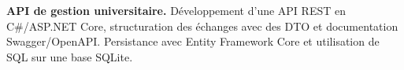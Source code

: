 
\begin{cvparagraph}
\noindent\textbf{API de gestion universitaire.} Développement d’une API REST en C\#/ASP.NET Core, structuration des échanges avec des DTO et documentation Swagger/OpenAPI. Persistance avec Entity Framework Core et utilisation de SQL sur une base SQLite.
\end{cvparagraph}
